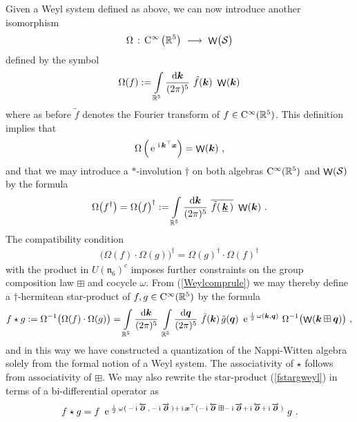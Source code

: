 \documentclass[11pt,a4paper]{article}
\DeclareMathOperator{\weyl}{{\sf W}}                   %
\newcommand{\comp}{\boxplus}                            %
\newcommand{\ii}{{\rm i}}
\newcommand{\mbf}[1]{{\boldsymbol {#1} }}
\def\ii{{\,{\rm i}\,}}
\def\dd{{\rm d}}
\def\CC{{\rm C}}
\def\mx{{\mbf x}}
\def\mk{{\mbf k}}
\def\mq{{\mbf q}}
\def\mfn{{\mathfrak n}}
\def\mcS{{\mathcal S}}
\newcommand{\real}{{\mathbb R}} %
\def\e{{\,\rm e}\,}
\def\d{\partial}
\newcommand{\beq}{\begin{eqnarray}}
\newcommand{\eeq}{\end{eqnarray}}
\begin{document}
Given a Weyl system defined as above, we can now introduce
another isomorphism
\beq
\Omega\,:\,\CC^\infty\left(\real^5\right)~\longrightarrow~
\weyl\bigl(\mathcal{S}\bigr)
\label{Omegaquantmap}\eeq
defined by the symbol
\beq
\Omega(f):=\int\limits_{\real^5}\frac{\dd\mk}{(2\pi)^5}~
\tilde{f}(\mk)~\weyl(\mk)
\label{Omegafdef}\eeq
where as before $\tilde f$ denotes the Fourier transform of
$f\in\CC^\infty(\real^5)$. This definition implies that
\beq
\Omega\left(\e^{\ii\mk^\top\mx}\right)=\weyl(\mk) \ ,
\label{weylmkDelta}\eeq
and that we may introduce a $*$-involution $\dag$ on both algebras
$\CC^\infty(\real^5)$ and $\weyl(\mcS)$ by the formula
\beq
\Omega\bigl(f^\dag\bigr)=\Omega\bigl(f\bigr)^\dag:=
\int\limits_{\real^5}\frac{\dd\mk}{(2\pi)^5}~\overline{
\tilde f(\,\underline{\mk}\,)}~\weyl(\mk) \ .
\label{involdef}\eeq
The compatibility condition
\beq
\bigl(\Omega(f)\cdot\Omega(g)\bigr)^\dag=\Omega(g)^\dag\cdot
\Omega(f)^\dag
\label{compconddag}\eeq
with the product in $U(\mfn_6)^c$ imposes further constraints on the
group composition law $\comp$ and cocycle $\omega$. From
(\ref{Weylcomprule}) we may thereby define a $\dag$-hermitean
star-product of $f,g\in\CC^\infty(\real^5)$ by the formula
\beq
f\star g:=\Omega^{-1}\bigl(\Omega(f)\cdot\Omega(g)\bigr)
=\int\limits_{\real^5}\frac{\dd\mk}{(2\pi)^5}~
\int\limits_{\real^5}\frac{\dd\mq}{(2\pi)^5}~\tilde f(\mk)\,
\tilde g(\mq)~\e^{\frac\ii2\,\omega(\mk,\mq)}~
\Omega^{-1}\bigl(\weyl(\mk\comp\mq)\bigr) \ ,
\label{fstargweyl}\eeq
and in this way we have constructed a quantization of the Nappi-Witten
algebra solely from the formal notion of a Weyl system.
The associativity of $\star$ follows from associativity of
$\comp$. We may also rewrite the star-product (\ref{fstargweyl}) in
terms of a bi-differential operator as
\beq
f\star g=f~\e^{\frac\ii2\,\omega(\,-\ii\overleftarrow{\mbf\d}\,,\,
-\ii\overrightarrow{\mbf\d}\,)+\ii\mx^\top(-\ii\overleftarrow{\mbf\d}\,\comp
-\ii\overrightarrow{\mbf\d}+\ii\overleftarrow{\mbf\d}+\ii
\overrightarrow{\mbf\d}\,)}~g \ .
\label{bidiffweyl}\eeq
\end{document}
